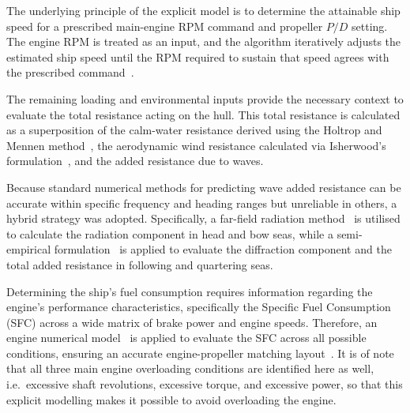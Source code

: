 \documentclass[final,5p,times,twocolumn,numbers]{elsarticle}
\begin{document}
The underlying principle of the explicit model is to determine the attainable ship speed for a prescribed main-engine RPM command and propeller $P/D$ setting. The engine RPM is treated as an input, and the algorithm iteratively adjusts the estimated ship speed until the RPM required to sustain that speed agrees with the prescribed command~\cite{vettor2018martech}.

The remaining loading and environmental inputs provide the necessary context to evaluate the total resistance acting on the hull. This total resistance is calculated as a superposition of the calm-water resistance derived using the Holtrop and Mennen method~\cite{holtrop1984,holtrop1982}, the aerodynamic wind resistance calculated via Isherwood's formulation~\cite{isherwood1973,vettor2018brodo}, and the added resistance due to waves.

Because standard numerical methods for predicting wave added resistance can be accurate within specific frequency and heading ranges but unreliable in others, a hybrid strategy was adopted. Specifically, a far-field radiation method~\cite{soding2015} is utilised to calculate the radiation component in head and bow seas, while a semi-empirical formulation~\cite{liu2020} is applied to evaluate the diffraction component and the total added resistance in following and quartering seas.

Determining the ship's fuel consumption requires information regarding the engine's performance characteristics, specifically the Specific Fuel Consumption (SFC) across a wide matrix of brake power and engine speeds. Therefore, an engine numerical model~\cite{tadros2019} is applied to evaluate the SFC across all possible conditions, ensuring an accurate engine-propeller matching layout~\cite{tadros2021}. It is of note that all three main engine overloading conditions are identified here as well, i.e.\ excessive shaft revolutions, excessive torque, and excessive power, so that this explicit modelling makes it possible to avoid overloading the engine.
\end{document}
